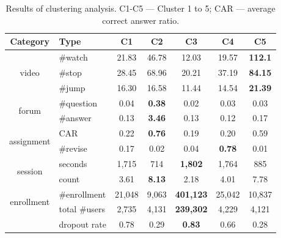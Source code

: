     
    \begin{table}
    \hspace{-0.01in}
    	\centering
    	\caption{Results of clustering analysis. C1-C5 --- Cluster 1 to 5; CAR --- average correct answer ratio. }
    	\small
    	\label{tab:clusterStat}
    	\setlength{\tabcolsep}{1mm}\begin{tabular}{@{}c@{}|l@{}|c|c|c|c|c@{}}
    		\hline
    		\hline
    		Category &  Type   & C1& C2 & C3& C4&C5 \\
    		\hline
    		\multirow{3}{*}{video}&  \#watch &21.83 &46.78 &12.03&19.57 & \textbf{112.1}\\	
    		\cline{2-7}
    		& \#stop     &28.45 & 68.96&20.21&37.19& \textbf{84.15}\\
    		\cline{2-7}
    		& \#jump   &16.30 & 16.58& 11.44& 14.54& \textbf{21.39} \\
    		\hline
    		\multirow{2}{*}{forum}&  \#question & 0.04 & \textbf{0.38} &0.02 & 0.03 & 0.03 \\
    		\cline{2-7}
    		& \#answer &0.13 &\textbf{3.46}&0.13&0.12&0.17\\
    		\hline
    		\multirow{2}{*}{assignment} & CAR &0.22 & \textbf{0.76} & 0.19& 0.20 & 0.59\\
    		\cline{2-7}
    		& \#revise  &0.17 & 0.02& 0.04& \textbf{0.78}& 0.01\\
    		\hline
    		\multirow{2}{*}{session}    & seconds &1,715 &714& \textbf{1,802}& 1,764& 885\\
    		\cline{2-7}                
    		&  count     &3.61 &\textbf{8.13}& 2.18&4.01& 7.78\\ 
    		\hline
    		\multirow{2}{*}{enrollment} & \#enrollment & 21,048 & 9,063&\textbf{401,123} &25,042 & 10,837\\
    		\cline{2-7}
    		& total \#users & 2,735 & 4,131& \textbf{239,302} & 4,229 & 4,121 \\
    		\cline{2-7}
    		& dropout rate &0.78 &0.29 &\textbf{0.83} &0.66 &0.28\\
    		\hline	
    		\hline
    	\end{tabular}
    	\normalsize
    \end{table}

